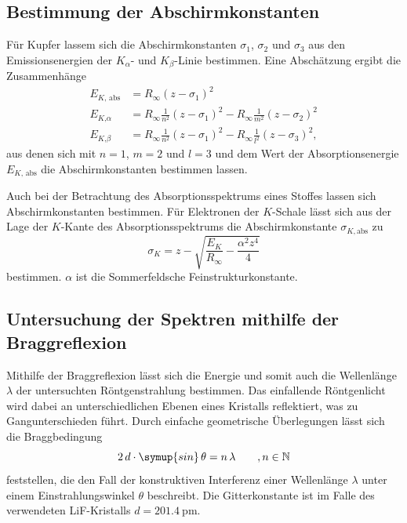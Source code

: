 \subsection{Bestimmung der Abschirmkonstanten}
\label{subsec:Abschirmkonstante}
Für Kupfer lassem sich die Abschirmkonstanten $\sigma_1$, $\sigma_2$ und $\sigma_3$ aus den Emissionsenergien der $K_\alpha$- und $K_\beta$-Linie bestimmen.
Eine Abschätzung ergibt die Zusammenhänge 
\begin{align}
    \label{eqn:Sigma_Kupfer}
    E_{K \text{, abs}} &= R_\infty (z - \sigma_1)^2 \\
    E_{K \text{,} \alpha} &= R_\infty \frac{1}{n^2} (z - \sigma_1)^2 - R_\infty \frac{1}{m^2} (z - \sigma_2)^2 \\
    E_{K \text{,} \beta} &= R_\infty \frac{1}{n^2} (z - \sigma_1)^2 - R_\infty \frac{1}{l^2} (z - \sigma_3)^2, 
\end{align}
aus denen sich mit $n = 1$, $m = 2$ und $l = 3$ und dem Wert der Absorptionsenergie $E_{K\text{, abs}}$ die Abschirmkonstanten bestimmen lassen.

Auch bei der Betrachtung des Absorptionsspektrums eines Stoffes lassen sich Abschirmkonstanten bestimmen. 
Für Elektronen der $K$-Schale lässt sich aus der Lage der $K$-Kante des Absorptionsspektrums die Abschirmkonstante $\sigma_{K, \text{abs}}$ zu 
\begin{equation}
    \label{eqn:Sigma_K}
    \sigma_K = z - \sqrt{\frac{E_K}{R_\infty} - \frac{\alpha^2 z^4}{4}}
\end{equation}
bestimmen. $\alpha$ ist die Sommerfeldsche Feinstrukturkonstante.

\subsection{Untersuchung der Spektren mithilfe der Braggreflexion}
\label{subsec:Bragg}
Mithilfe der Braggreflexion lässt sich die Energie und somit auch die Wellenlänge $\lambda$ der untersuchten Röntgenstrahlung bestimmen. 
Das einfallende Röntgenlicht wird dabei an unterschiedlichen Ebenen eines Kristalls reflektiert, was zu Gangunterschieden führt. Durch einfache
geometrische Überlegungen lässt sich die Braggbedingung
\begin{equation}
    \label{eqn:Bragg}
    2 \, d \cdot \symup{sin} \, \theta = n \, \lambda \qquad , n \in \mathbb{N}
\end{equation}
feststellen, die den Fall der konstruktiven Interferenz einer Wellenlänge $\lambda$ unter einem Einstrahlungswinkel $\theta$ beschreibt.
Die Gitterkonstante ist im Falle des verwendeten LiF-Kristalls $d = \qty{201.4}{\pico\metre}$.
